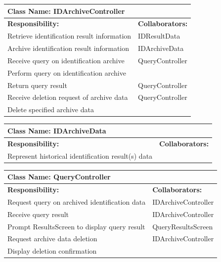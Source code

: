 \documentclass[]{article}
\begin{document}
\newpage
	\begin{table}[ht]
		\centering
		\begin{tabular}{|p{5cm}|p{5cm}|}
		\hline 
		 \multicolumn{2}{|l|}{\textbf{Class Name: IDArchiveController}} \\
		\hline
		\textbf{Responsibility:} & \textbf{Collaborators:} \\
		\hline
		Retrieve identification result information & IDResultData \\
		\hline
		Archive identification result information & IDArchiveData \\
		\hline
		Receive query on identification archive & QueryController \\
		\hline
		Perform query on identification archive &  \\
		\hline
		Return query result & QueryController \\
		\hline
		Receive deletion request of archive data & QueryController \\
		\hline
		Delete specified archive data &  \\
		\hline
		\end{tabular}
	\end{table}
	

	\begin{table}[ht]
		\centering
		\begin{tabular}{|p{5cm}|p{5cm}|}
		\hline 
		 \multicolumn{2}{|l|}{\textbf{Class Name: IDArchiveData}} \\
		\hline
		\textbf{Responsibility:} & \textbf{Collaborators:} \\
		\hline
		Represent historical identification result(s) data &  \\
		\hline
		\end{tabular}
	\end{table}
	
	\begin{table}[ht]
		\centering
		\begin{tabular}{|p{5cm}|p{5cm}|}
		\hline 
		 \multicolumn{2}{|l|}{\textbf{Class Name: QueryController}} \\
		\hline
		\textbf{Responsibility:} & \textbf{Collaborators:} \\
		\hline
		Request query on archived identification data & IDArchiveController \\
		\hline
		Receive query result & IDArchiveController \\
		\hline
		Prompt ResultsScreen to display query result & QueryResultsScreen \\
		\hline
		Request archive data deletion & IDArchiveController \\
		\hline
		Display deletion confirmation &  \\
		\hline
		\end{tabular}
	\end{table}
	
\end{document}
